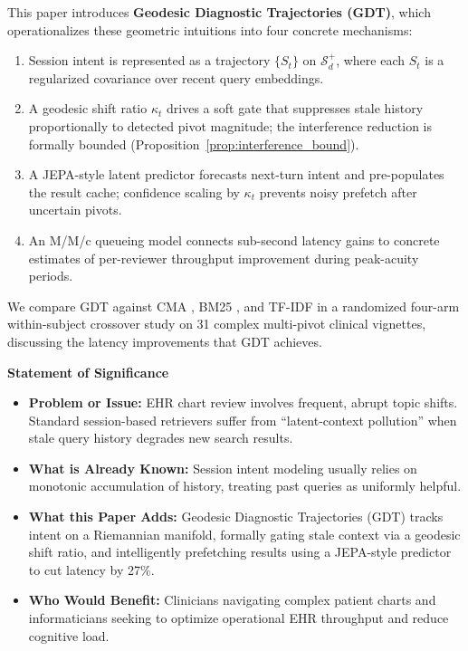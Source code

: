 \documentclass[review]{elsarticle}
\begin{document}
This paper introduces \textbf{Geodesic Diagnostic Trajectories (GDT)}, which
operationalizes these geometric intuitions into four concrete mechanisms:
\begin{enumerate}
  \item Session intent is represented as a trajectory $\{S_t\}$ on $\mathcal{S}_d^+$, where each $S_t$ is a regularized covariance over recent query embeddings.
  \item A geodesic shift ratio $\kappa_t$ drives a soft gate that suppresses stale history proportionally to detected pivot magnitude; the interference reduction is formally bounded (Proposition~\ref{prop:interference_bound}).
  \item A JEPA-style latent predictor \cite{assran2023_ijepa} forecasts next-turn intent and pre-populates the result cache; confidence scaling by $\kappa_t$ prevents noisy prefetch after uncertain pivots.
  \item An M/M/c queueing model \cite{kleinrock1975} connects sub-second latency gains to concrete estimates of per-reviewer throughput improvement during peak-acuity periods.
\end{enumerate}

We compare GDT against CMA \cite{cma2026,cma2026_clinical}, BM25
\cite{robertson1995}, and TF-IDF \cite{salton83} in a randomized four-arm
within-subject crossover study on 31 complex multi-pivot clinical vignettes,
discussing the latency improvements that GDT achieves.

\vspace{1em}
\noindent\textbf{Statement of Significance}
\begin{itemize}
    \item \textbf{Problem or Issue:} EHR chart review involves frequent, abrupt topic shifts. Standard session-based retrievers suffer from ``latent-context pollution'' when stale query history degrades new search results.
    \item \textbf{What is Already Known:} Session intent modeling usually relies on monotonic accumulation of history, treating past queries as uniformly helpful.
    \item \textbf{What this Paper Adds:} Geodesic Diagnostic Trajectories (GDT) tracks intent on a Riemannian manifold, formally gating stale context via a geodesic shift ratio, and intelligently prefetching results using a JEPA-style predictor to cut latency by 27\%.
    \item \textbf{Who Would Benefit:} Clinicians navigating complex patient charts and informaticians seeking to optimize operational EHR throughput and reduce cognitive load.
\end{itemize}
\vspace{1em}
\end{document}
